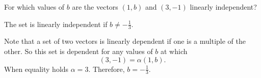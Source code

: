 \documentclass{ximera}
\begin{document}
\begin{exercise} \label{c5.4.2}
For which values of $b$ are the vectors $(1,b)$ and $(3,-1)$
linearly independent?

\begin{solution}

\ans The set is linearly independent if $b \neq -\frac{1}{3}$.

\soln Note that a set of two vectors is linearly dependent if one is
a multiple of the other.  So this set is dependent for any values of
$b$ at which
\[
(3,-1) = \alpha(1,b).
\]
When equality holds $\alpha = 3$.  Therefore, $b = -\frac{1}{3}$.  

\end{solution}
\end{exercise}
\end{document}
